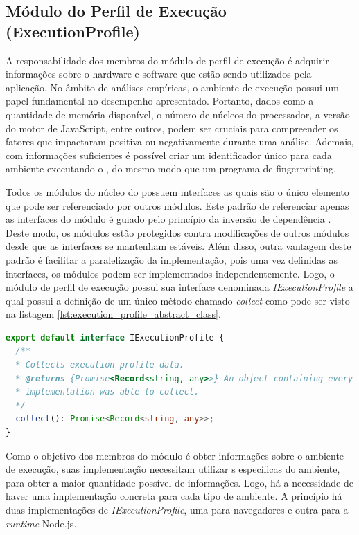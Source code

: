 \documentclass[12pt]{tcc}
\begin{document}
	\subsection{Módulo do Perfil de Execução (ExecutionProfile)}
	\label{subsection:modulo-execution-profile}

	
	A responsabilidade dos membros do módulo de perfil de execução é adquirir informações sobre o hardware e software que estão sendo utilizados pela aplicação.
	No âmbito de análises empíricas, o ambiente de execução possui um papel fundamental no desempenho apresentado.
	Portanto, dados como a quantidade de memória disponível, o número de núcleos do processador, a versão do motor de JavaScript, entre outros, podem ser cruciais para compreender os fatores que impactaram positiva ou negativamente durante uma análise.
	Ademais, com informações suficientes é possível criar um identificador único para cada ambiente executando o , do mesmo modo que um programa de fingerprinting.
	
	Todos os módulos do núcleo do  possuem interfaces as quais são o único elemento que pode ser referenciado por outros módulos.
	Este padrão de referenciar apenas as interfaces do módulo é guiado pelo princípio da inversão de dependência \citep{MartinCleanArchtecture2017}.
	Deste modo, os módulos estão protegidos contra modificações de outros módulos desde que as interfaces se mantenham estáveis.
	Além disso, outra vantagem deste padrão é facilitar a paralelização da implementação, pois uma vez definidas as interfaces, os módulos podem ser implementados independentemente.
	Logo, o módulo de perfil de execução possui sua interface denominada \emph{IExecutionProfile} a qual possui a definição de um único método chamado \emph{collect} como pode ser visto na listagem \ref{lst:execution_profile_abstract_class}.

\begin{lstlisting}[label={lst:execution_profile_abstract_class}, caption={Implementação da classe responsável por representar um perfil de execução.}, language=TypeScript, breaklines=true]
export default interface IExecutionProfile {
  /**
  * Collects execution profile data.
  * @returns {Promise<Record<string, any>>} An object containing every execution profile data the
  * implementation was able to collect.
  */
  collect(): Promise<Record<string, any>>;
}
\end{lstlisting}

	Como o objetivo dos membros do módulo é obter informações sobre o ambiente de execução, suas implementação necessitam utilizar s específicas do ambiente, para obter a maior quantidade possível de informações.
	Logo, há a necessidade de haver uma implementação concreta para cada tipo de ambiente.
	A princípio há duas implementações de \emph{IExecutionProfile}, uma para navegadores e outra para a \emph{runtime} Node.js.
\end{document}
